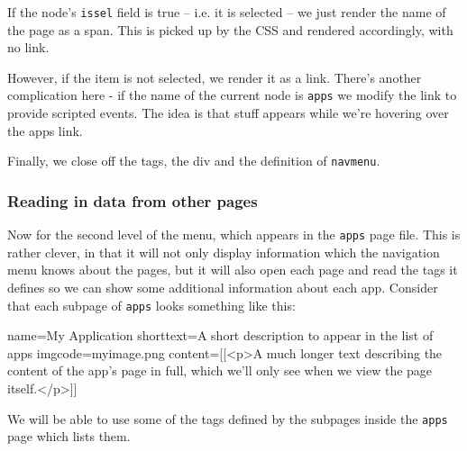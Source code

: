 If the node's \texttt{issel} field is true -- i.e. it is selected -- we just render the name of the page
as a span. This is picked up by the CSS and rendered accordingly, with no link.
\begin{MyVerbatim}
            <a href="{{a:url}}"
                {{streq|{{a:name}}|apps|
                    onmouseout="P2H_StartClock();"
                    onmouseover="P2H_Menu('PMgamesbutton',0,0);"
                |}}>
            {{a:name}}</a>}}
\end{MyVerbatim}
However, if the item is not selected, we render it as a link. There's another complication here - if
the name of the current node is \texttt{apps} we modify the link to provide scripted events. The idea
is that stuff appears while we're hovering over the apps link.
\begin{MyVerbatim}
        }}
    }}
    </div>
}}

]]
\end{MyVerbatim}
Finally, we close off the tags, the div and the definition of \texttt{navmenu}.

\subsubsection{Reading in data from other pages}
Now for the second level of the menu, which appears in the \texttt{apps}
page file. This is rather clever, in that it will not only display information which
the navigation menu knows about the pages, but it will also open each page and read
the tags it defines so we can show some additional information about each app.
Consider that each subpage of \texttt{apps} looks something like this:
\begin{MyVerbatim}
name=My Application
shorttext=A short description to appear in the list of apps
imgcode=myimage.png
content=[[<p>A much longer text describing the content
of the app's page in full, which we'll only see
when we view the page itself.</p>]]
\end{MyVerbatim}
We will be able to use some of the tags defined by the subpages inside
the \texttt{apps} page which lists them.

